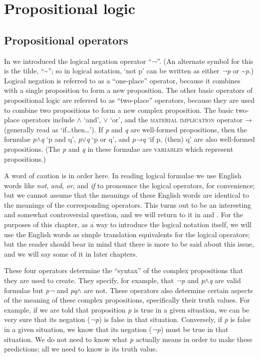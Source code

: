 \section{Propositional logic}\label{sec:4.3}
\subsection{Propositional operators}\label{sec:4.3.1}

In  we introduced the logical negation operator “¬”. (An alternate symbol for this is the tilde, “{\textasciitilde}”; so in logical notation, ‘not p’ can be written as either \textit{¬p} or {\textasciitilde}\textit{p}.) Logical negation is referred to as a “one-place” operator, because it combines with a single proposition to form a new proposition. The other basic operators of propositional logic are referred to as “two-place” operators, because they are used to combine two propositions to form a new complex proposition. The basic two-place operators include $\wedge$ ‘and’, $\vee$ ‘or’, and the \textsc{material} \textsc{implication} operator → (generally read as ‘if…then…’). If \textit{p} and \textit{q} are well-formed propositions, then the formulae \textit{p$\wedge$}\textit{q} ‘p and q’, \textit{p$\vee$}\textit{q} ‘p or q’, and \textit{p→}\textit{q} ‘if p, (then) q’ are also well-formed propositions. (The \textit{p} and \textit{q} in these formulae are \textsc{variables} which represent propositions.)



A word of caution is in order here. In reading logical formulae we use English words like \textit{not}, \textit{and}, \textit{or}, and \textit{if} to pronounce the logical operators, for convenience; but we cannot assume that the meanings of these English words are identical to the meanings of the corresponding operators. This turns out to be an interesting and somewhat controversial question, and we will return to it in  and . For the purposes of this chapter, as a way to introduce the logical notation itself, we will use the English words as simple translation equivalents for the logical operators; but the reader should bear in mind that there is more to be said about this issue, and we will say some of it in later chapters.



These four operators determine the “syntax” of the complex propositions that they are used to create. They specify, for example, that \textit{¬p} and \textit{p$\wedge$}\textit{q} are valid formulae but \textit{p¬} and \textit{pq$\wedge$} are not. These operators also determine certain aspects of the meaning of these complex propositions, specifically their truth values. For example, if we are told that proposition \textit{p} is true in a given situation, we can be very sure that its negation (\textit{¬p}) is false in that situation. Conversely, if \textit{p} is false in a given situation, we know that its negation (\textit{¬p}) must be true in that situation. We do not need to know what \textit{p} actually means in order to make these predictions; all we need to know is its truth value.



